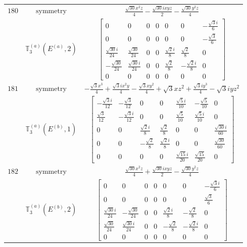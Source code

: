 \documentclass[fleqn,8pt,landscape]{jsarticle}
\begin{document}
\begin{longtable}{ccc}
$ 180 $ & $ \text{symmetry} $ & $ \frac{\sqrt{30} x^{2} z}{4} - \frac{\sqrt{30} i x y z}{2} - \frac{\sqrt{30} y^{2} z}{4} $ \\
$  $ & $ \mathbb{T}_{3}^{(a)}(E^{(a)},2) $ & $ \begin{bmatrix} 0 & 0 & 0 & 0 & 0 & 0 & - \frac{\sqrt{3} i}{6} \\ 0 & 0 & 0 & 0 & 0 & 0 & - \frac{\sqrt{3}}{6} \\ \frac{\sqrt{30} i}{24} & \frac{\sqrt{30}}{24} & 0 & 0 & \frac{\sqrt{2} i}{8} & \frac{\sqrt{2}}{8} & 0 \\ - \frac{\sqrt{30}}{24} & \frac{\sqrt{30} i}{24} & 0 & 0 & \frac{\sqrt{2}}{8} & - \frac{\sqrt{2} i}{8} & 0 \\ 0 & 0 & 0 & 0 & 0 & 0 & 0 \end{bmatrix} $ \\ \hline
$ 181 $ & $ \text{symmetry} $ & $ - \frac{\sqrt{3} x^{3}}{4} + \frac{\sqrt{3} i x^{2} y}{4} - \frac{\sqrt{3} x y^{2}}{4} + \sqrt{3} x z^{2} + \frac{\sqrt{3} i y^{3}}{4} - \sqrt{3} i y z^{2} $ \\
$  $ & $ \mathbb{T}_{3}^{(a)}(E^{(b)},1) $ & $ \begin{bmatrix} - \frac{\sqrt{3} i}{12} & - \frac{\sqrt{3}}{12} & 0 & 0 & \frac{\sqrt{5} i}{10} & - \frac{\sqrt{5}}{10} & 0 \\ \frac{\sqrt{3}}{12} & - \frac{\sqrt{3} i}{12} & 0 & 0 & \frac{\sqrt{5}}{10} & \frac{\sqrt{5} i}{10} & 0 \\ 0 & 0 & \frac{\sqrt{2} i}{8} & \frac{\sqrt{2}}{8} & 0 & 0 & \frac{\sqrt{30} i}{60} \\ 0 & 0 & - \frac{\sqrt{2}}{8} & \frac{\sqrt{2} i}{8} & 0 & 0 & \frac{\sqrt{30}}{60} \\ 0 & 0 & 0 & 0 & \frac{\sqrt{15} i}{20} & \frac{\sqrt{15}}{20} & 0 \end{bmatrix} $ \\ \hline
$ 182 $ & $ \text{symmetry} $ & $ \frac{\sqrt{30} x^{2} z}{4} + \frac{\sqrt{30} i x y z}{2} - \frac{\sqrt{30} y^{2} z}{4} $ \\
$  $ & $ \mathbb{T}_{3}^{(a)}(E^{(b)},2) $ & $ \begin{bmatrix} 0 & 0 & 0 & 0 & 0 & 0 & - \frac{\sqrt{3} i}{6} \\ 0 & 0 & 0 & 0 & 0 & 0 & \frac{\sqrt{3}}{6} \\ \frac{\sqrt{30} i}{24} & - \frac{\sqrt{30}}{24} & 0 & 0 & \frac{\sqrt{2} i}{8} & - \frac{\sqrt{2}}{8} & 0 \\ \frac{\sqrt{30}}{24} & \frac{\sqrt{30} i}{24} & 0 & 0 & - \frac{\sqrt{2}}{8} & - \frac{\sqrt{2} i}{8} & 0 \\ 0 & 0 & 0 & 0 & 0 & 0 & 0 \end{bmatrix} $ \\ \hline

\end{longtable}
\end{document}
